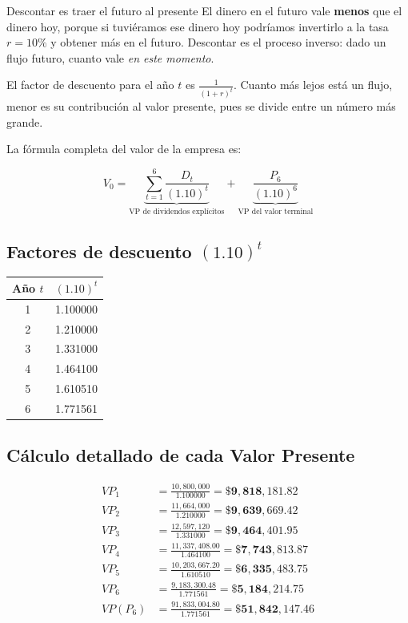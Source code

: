 \documentclass[12pt,a4paper]{article}
\begin{document}
\begin{cajaintuicion}{Descontar es traer el futuro al presente}
El dinero en el futuro vale \textbf{menos} que el dinero hoy, porque si tuvi\'eramos ese dinero
hoy podr\'iamos invertirlo a la tasa $r = 10\%$ y obtener m\'as en el futuro. Descontar es
el proceso inverso: dado un flujo futuro, cuanto vale \emph{en este momento}.

El factor de descuento para el a\~no $t$ es $\frac{1}{(1+r)^t}$. Cuanto m\'as lejos est\'a
un flujo, menor es su contribuci\'on al valor presente, pues se divide entre un n\'umero m\'as
grande.
\end{cajaintuicion}

La f\'ormula completa del valor de la empresa es:

\[
V_0 = \underbrace{\sum_{t=1}^{6} \frac{D_t}{(1.10)^t}}_{\text{VP de dividendos expl\'icitos}}
    + \underbrace{\frac{P_6}{(1.10)^6}}_{\text{VP del valor terminal}}
\]

\subsection*{Factores de descuento $(1.10)^t$}

\begin{center}
\begin{tabular}{cc}
\toprule
\textbf{A\~no} $t$ & $(1.10)^t$ \\
\midrule
1 & 1.100000 \\
2 & 1.210000 \\
3 & 1.331000 \\
4 & 1.464100 \\
5 & 1.610510 \\
6 & 1.771561 \\
\bottomrule
\end{tabular}
\end{center}

\subsection*{C\'alculo detallado de cada Valor Presente}

\begin{align}
VP_1 &= \frac{10{,}800{,}000}{1.100000} = \mathbf{\$9{,}818{,}181.82} \\[6pt]
VP_2 &= \frac{11{,}664{,}000}{1.210000} = \mathbf{\$9{,}639{,}669.42} \\[6pt]
VP_3 &= \frac{12{,}597{,}120}{1.331000} = \mathbf{\$9{,}464{,}401.95} \\[6pt]
VP_4 &= \frac{11{,}337{,}408.00}{1.464100} = \mathbf{\$7{,}743{,}813.87} \\[6pt]
VP_5 &= \frac{10{,}203{,}667.20}{1.610510} = \mathbf{\$6{,}335{,}483.75} \\[6pt]
VP_6 &= \frac{9{,}183{,}300.48}{1.771561} = \mathbf{\$5{,}184{,}214.75} \\[10pt]
VP(P_6) &= \frac{91{,}833{,}004.80}{1.771561} = \mathbf{\$51{,}842{,}147.46}
\end{align}
\end{document}
